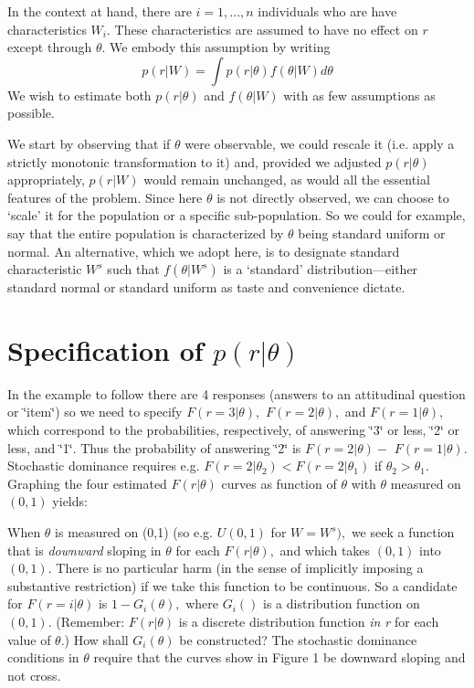 \documentclass{amsart}
\begin{document}
In the context at hand, there are $i=1,...,n$ individuals who are
have characteristics $W_{i}.$ These characteristics are assumed to
have no effect on $r$ except through $\theta.$ We embody this assumption
by writing\begin{equation}
p(r|W)=\int p(r|\theta)f(\theta|W)d\theta\label{eq1}\end{equation}
We wish to estimate both $p(r|\theta)$ and $f(\theta|W)$ with as
few assumptions as possible.

We start by observing that if $\theta$ were observable, we could
rescale it (i.e. apply a strictly monotonic transformation to it)
and, provided we adjusted $p(r|\theta)$ appropriately, $p(r|W)$
would remain unchanged, as would all the essential features of the
problem. Since here $\theta$ is not directly observed, we can choose
to `scale' it for the population or a specific sub-population. So
we could for example, say that the entire population is characterized
by $\theta$ being standard uniform or normal. An alternative, which
we adopt here, is to designate standard characteristic $W^{s}$ such
that $f\left(\theta|W^{s}\right)$ is a `standard' distribution---either
standard normal or standard uniform as taste and convenience dictate.

\section{ Specification of $p(r|\theta)$ }

In the example to follow there are 4 responses (answers to an attitudinal
question or \char`\"{}item\char`\"{}) so we need to specify $F(r=3|\theta),$
$F(r=2|\theta),$ and $F(r=1|\theta),$ which correspond to the probabilities,
respectively, of answering \char`\"{}3\char`\"{} or less, \char`\"{}2\char`\"{}
or less, and \char`\"{}1\char`\"{}. Thus the probability of answering
\char`\"{}2\char`\"{} is $F(r=2|\theta)-$ $F(r=1|\theta).$ Stochastic
dominance requires e.g. $F(r=2|\theta_{2})<F(r=2|\theta_{1})$ if
$\theta_{2}>\theta_{1}.$ Graphing the four estimated $F(r|\theta)$
curves as function of $\theta$ with $\theta$ measured on $(0,1)$
yields:

When $\theta$ is measured on (0,1) (so e.g. $U(0,1)$ for $W=W^{s}),$
we seek a function that is \emph{downward} sloping in $\theta$ for
each $F(r|\theta),$ and which takes $(0,1)$ into $(0,1).$ There
is no particular harm (in the sense of implicitly imposing a substantive
restriction) if we take this function to be continuous. So a candidate
for $F(r=i|\theta)$ is $1-G_{i}(\theta),$ where $G_{i}()$ is a
distribution function on $(0,1).$ (Remember: $F(r|\theta)$ is a
discrete distribution function \emph{in r} for each value of $\theta.$)
How shall $G_{i}(\theta)$ be constructed? The stochastic dominance
conditions in $\theta$ require that the curves show in Figure 1 be
downward sloping and not cross.
\end{document}
